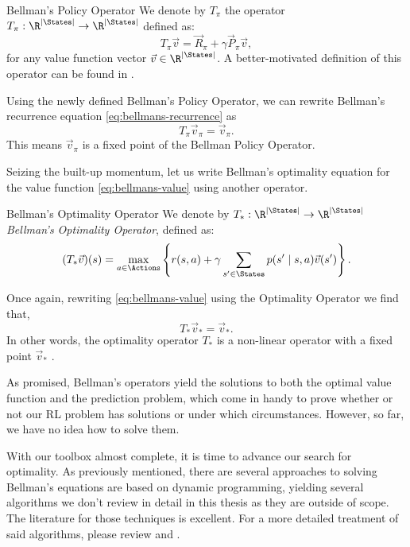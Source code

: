 \begin{dfn}{Bellman's Policy Operator}{}
    We denote by $T_\pi$ the operator $T_\pi: \R^{|\States|} \to \R^{|\States|}$
    defined as:
    \begin{equation*}
        T_\pi \vec{v} = \vec{R}_\pi + \gamma \vec{P}_\pi \vec{v},
    \end{equation*}
    for any value function vector $\vec{v} \in \R^{|\States|}$. A
    better-motivated definition of this operator can be found in
    \cite[Ch.~5.4]{raoRL4F}.
\end{dfn}

Using the newly defined Bellman's Policy Operator, we can rewrite Bellman's
recurrence equation \eqref{eq:bellmans-recurrence} as
\begin{equation*}
    T_\pi \vec{v}_\pi = \vec{v}_\pi.
\end{equation*}
This means $\vec{v}_\pi$ is a fixed point of the Bellman Policy Operator.

Seizing the built-up momentum, let us write Bellman's optimality equation for
the value function \eqref{eq:bellmans-value} using another operator.

\begin{dfn}{Bellman's Optimality Operator}{}
    We denote by $T_*: \R^{|\States|} \to \R^{|\States|}$ \emph{Bellman's Optimality Operator}, defined as:
    \begin{equation*}
        (T_{*} \vec{v})(s) = \max_{a \in \Actions} \left\{ r(s, a) + \gamma \sum_{s' \in \States} p(s' \mid s, a) \vec{v}(s') \right\}. 
    \end{equation*}
\end{dfn}

Once again, rewriting \eqref{eq:bellmans-value} using the Optimality Operator we
find that,
\begin{equation}
    \label{eq:bellmans-optimality-operators}
    T_* \vec{v}_{*} = \vec{v}_{*}.
\end{equation}
In other words, the optimality operator $T_*$ is a non-linear operator with a
fixed point $\vec{v}_*$ \cite[Lect. Jan 15 2019]{rao2022}.

As promised, Bellman's operators yield the solutions to both the optimal value
function and the prediction problem, which come in handy to prove whether or
not our RL problem has solutions or under which circumstances. However, so far,
we have no idea how to solve them.

With our toolbox almost complete, it is time to advance our search for
optimality. As previously mentioned, there are several approaches to solving
Bellman's equations are based on dynamic programming, yielding several
algorithms we don't review in detail in this thesis as they are outside of
scope. The literature for those techniques is excellent. For a more detailed
treatment of said algorithms, please review \cite{SuttonBarto} and
\cite{raoRL4F}.

